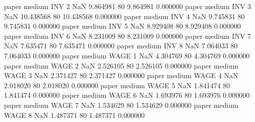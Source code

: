             paper     medium      INV                 2                  NaN  9.864981 80       9.864981           0.000000
            paper     medium      INV                 3                  NaN 10.438568 80      10.438568           0.000000
            paper     medium      INV                 4                  NaN  9.745831 80       9.745831           0.000000
            paper     medium      INV                 5                  NaN  8.929408 80       8.929408           0.000000
            paper     medium      INV                 6                  NaN  8.231009 80       8.231009           0.000000
            paper     medium      INV                 7                  NaN  7.635471 80       7.635471           0.000000
            paper     medium      INV                 8                  NaN  7.064033 80       7.064033           0.000000
            paper     medium     WAGE                 1                  NaN  4.304769 80       4.304769           0.000000
            paper     medium     WAGE                 2                  NaN  2.526105 80       2.526105           0.000000
            paper     medium     WAGE                 3                  NaN  2.371427 80       2.371427           0.000000
            paper     medium     WAGE                 4                  NaN  2.018020 80       2.018020           0.000000
            paper     medium     WAGE                 5                  NaN  1.841474 80       1.841474           0.000000
            paper     medium     WAGE                 6                  NaN  1.693976 80       1.693976           0.000000
            paper     medium     WAGE                 7                  NaN  1.534629 80       1.534629           0.000000
            paper     medium     WAGE                 8                  NaN  1.487371 80       1.487371           0.000000